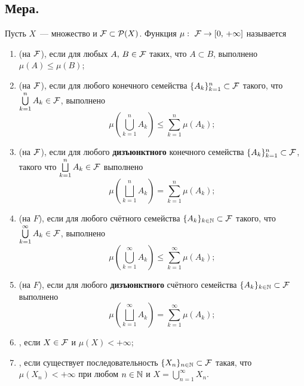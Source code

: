\subsection{Мера.}

\begin{definition}
    Пусть $X$~--- множество и $\mathcal{F} \subset\mathcal{P}(X)$. Функция $\mu:\ \mathcal{F} \rightarrow[0,\,+\infty]$
    называется
    \begin{enumerate}
        \item {} (на $\mathcal{F} $), если для любых $A,\, B\in\mathcal{F} $ таких, что 
        $A\subset B$, выполнено $\mu(A)\leqslant \mu(B)$;

        \item {} (на $\mathcal{F} $), если для любого конечного
        семейства $\{A_k\}_{k=1}^n\subset\mathcal{F} $ такого, что $\bigcup\limits_{k=1}^n A_k\in\mathcal{F} $, 
        выполнено
        \[
            \mu\left(\bigcup_{k=1}^nA_k\right)\leqslant\sum_{k=1}^n\mu(A_k);
        \]
        
        \item {} (на $\mathcal{F} $), если для любого \textbf{дизъюнктного} 
        конечного семейства $\{A_k\}_{k=1}^n\subset\mathcal{F} $, такого что 
        $\bigsqcup\limits_{k=1}^n A_k\in\mathcal{F} $ выполнено 
        \[
            \mu\left(\bigsqcup_{k=1}^nA_k\right)=\sum_{k=1}^n\mu(A_k);
        \]
        
        \item {} (на $F$), если для любого счётного семейства
        $\{A_k\}_{k\in\mathbb{N}}\subset\mathcal{F} $ такого, что $\bigcup\limits_{k=1}^{\infty} A_k\in\mathcal{F} $,
        выполнено 
        \[
            \mu\left(\bigcup_{k=1}^{\infty}A_k\right)\leqslant\sum_{k=1}^{\infty}\mu(A_k);
        \]
        
        \item {} (на $F$), если для любого \textbf{дизъюнктного} счётного
        семейства $\{A_k\}_{k\in\mathbb{N}}\subset\mathcal{F} $ выполнено
        \[
            \mu\left(\bigsqcup_{k=1}^{\infty}A_k\right)=\sum_{k=1}^{\infty}\mu(A_k);
        \]
        
        \item {}, если $X\in\mathcal{F} $ и $\mu(X)<+\infty$;
        \item {}, если существует последовательность $\{X_n\}_{n\in\mathbb{N}}\subset\mathcal{F} $
        такая, что $\mu(X_n)<+\infty$ при любом $n\in\mathbb{N}$ и $X=\bigcup\limits_{n=1}^{\infty}X_n$.
    \end{enumerate}
\end{definition}